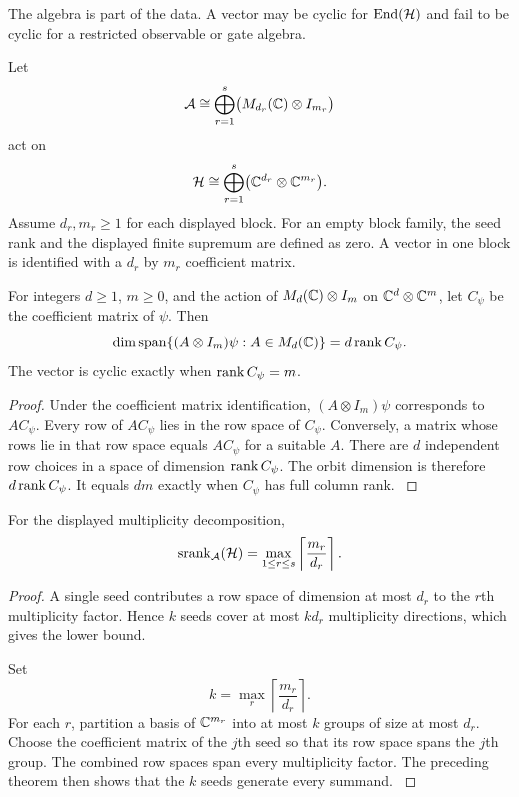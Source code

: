The algebra is part of the data. A vector may be cyclic for \(\operatorname{End}(\mathcal H)\) and fail to be cyclic for a restricted observable or gate algebra.

Let
\[
\mathcal A
\cong
\bigoplus_{r=1}^{s}
\bigl(M_{d_r}(\mathbb C)\otimes I_{m_r}\bigr)
\]
act on
\[
\mathcal H
\cong
\bigoplus_{r=1}^{s}
\bigl(\mathbb C^{d_r}\otimes\mathbb C^{m_r}\bigr).
\]
Assume \(d_r,m_r\ge1\) for each displayed block. For an empty block family, the seed rank and the displayed finite supremum are defined as zero. A vector in one block is identified with a \(d_r\) by \(m_r\) coefficient matrix.

\begin{theorem}\label{strong:theorem:001}\label{strong:thm:orbit_dimension}
For integers \(d\ge1\), \(m\ge0\), and the action of \(M_d(\mathbb C)\otimes I_m\) on \(\mathbb C^d\otimes\mathbb C^m\), let \(C_\psi\) be the coefficient matrix of \(\psi\). Then
\[
\dim\operatorname{span}\{(A\otimes I_m)\psi:A\in M_d(\mathbb C)\}
=
 d\operatorname{rank} C_\psi.
\]
The vector is cyclic exactly when \(\operatorname{rank} C_\psi=m\).
\end{theorem}

\begin{proof}\label{strong:proof:001}
Under the coefficient matrix identification, \((A\otimes I_m)\psi\) corresponds to \(AC_\psi\). Every row of \(AC_\psi\) lies in the row space of \(C_\psi\). Conversely, a matrix whose rows lie in that row space equals \(AC_\psi\) for a suitable \(A\). There are \(d\) independent row choices in a space of dimension \(\operatorname{rank} C_\psi\). The orbit dimension is therefore \(d\operatorname{rank} C_\psi\). It equals \(dm\) exactly when \(C_\psi\) has full column rank.
\label{strong:proof:001:end}\end{proof}

\begin{theorem}\label{strong:theorem:002}\label{strong:thm:quantum_seed_rank}
For the displayed multiplicity decomposition,
\[
\operatorname{srank}_{\mathcal A}(\mathcal H)
=
\max_{1\le r\le s}
\left\lceil\frac{m_r}{d_r}\right\rceil.
\]
\end{theorem}

\begin{proof}\label{strong:proof:002}
A single seed contributes a row space of dimension at most \(d_r\) to the \(r\)th multiplicity factor. Hence \(k\) seeds cover at most \(kd_r\) multiplicity directions, which gives the lower bound.

Set
\[
k=\max_r\left\lceil\frac{m_r}{d_r}\right\rceil.
\]
For each \(r\), partition a basis of \(\mathbb C^{m_r}\) into at most \(k\) groups of size at most \(d_r\). Choose the coefficient matrix of the \(j\)th seed so that its row space spans the \(j\)th group. The combined row spaces span every multiplicity factor. The preceding theorem then shows that the \(k\) seeds generate every summand.
\label{strong:proof:002:end}\end{proof}

